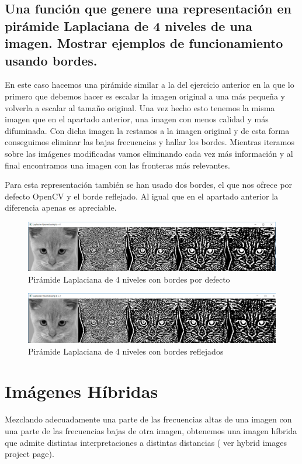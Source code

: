 \documentclass{article}
\begin{document}
\subsection{Una función que genere una representación en pirámide Laplaciana de 4 niveles de una imagen. Mostrar ejemplos de funcionamiento usando bordes.}
En este caso hacemos una pirámide similar a la del ejercicio anterior en la que lo primero que debemos hacer es escalar la imagen original a una más pequeña y volverla a escalar al tamaño original. Una vez hecho esto tenemos la misma imagen que en el apartado anterior, una imagen con menos calidad y más difuminada. Con dicha imagen la restamos a la imagen original y de esta forma conseguimos eliminar las bajas frecuencias y hallar los bordes. Mientras iteramos sobre las imágenes modificadas vamos eliminando cada vez más información y al final encontramos una imagen con las fronteras más relevantes.

Para esta representación también se han usado dos bordes, el que nos ofrece por defecto OpenCV y el borde reflejado. Al igual que en el apartado anterior la diferencia apenas es apreciable.


\begin{figure}[h]
\centering
\includegraphics[scale=0.4]{2e1.PNG}
\caption{Pirámide Laplaciana de 4 niveles con bordes por defecto}
\end{figure}

\begin{figure}[h]
\centering
\includegraphics[scale=0.4]{2e2.PNG}
\caption{Pirámide Laplaciana de 4 niveles con bordes reflejados}
\end{figure}

\newpage
\section{Imágenes Híbridas}
Mezclando adecuadamente una parte de las frecuencias altas de una imagen con una parte de las frecuencias bajas de otra imagen, obtenemos una imagen híbrida que admite distintas interpretaciones a distintas distancias ( ver hybrid images project page). 
\end{document}
